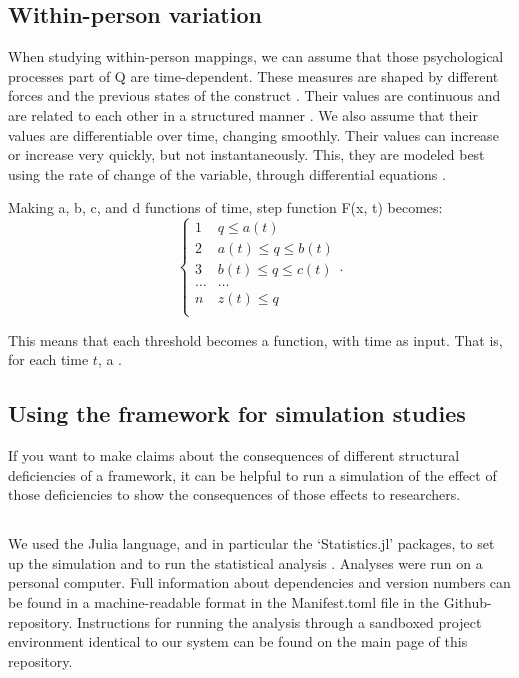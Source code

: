 \documentclass[utf8]{FrontiersinVancouver}
\begin{document}
\subsection{Within-person variation}
When studying within-person mappings, we can assume that those psychological processes part of Q are time-dependent. These measures are shaped by different forces and the previous states of the construct \citep{olthofComplexityPsychologicalSelfratings2020b}. Their values are continuous and are related to each other in a structured manner \citep{bokerConsequencesContinuityHunt2002}. We also assume that their values are differentiable over time, changing smoothly. Their values can increase or increase very quickly, but not instantaneously. This, they are modeled best using the rate of change of the variable, through differential equations \citep{molenaarNewPersonSpecificParadigm2009}.

Making a, b, c, and d functions of time, step function F(x, t) becomes: 
\[
\begin{cases} 
    1 & q \leq a(t)\\
    2 & a(t) \leq q \leq b(t)\\
    3 & b(t) \leq q \leq c(t)\\
    \ldots & \ldots\\    
    n & z(t) \leq q\\
\end{cases}.
\]

This means that each threshold becomes a function, with time as input. That is, for each time $t$, a . 


\subsection{Using the framework for simulation studies}
If you want to make claims about the consequences of different structural deficiencies of a framework, it can be helpful to run a simulation of the effect of those deficiencies to show the consequences of those effects to researchers. 


\subsection{}
We used the Julia language, and in particular the `Statistics.jl' packages, to set up the simulation and to run the statistical analysis \citep{bezanson2017julia, Datseris2018, DatserisParlitz2022}. Analyses were run on a personal computer.  Full information about dependencies and version numbers can be found in a machine-readable format in the Manifest.toml file in the Github-repository. Instructions for running the analysis through a sandboxed project environment identical to our system can be found on the main page of this repository. 
\end{document}
